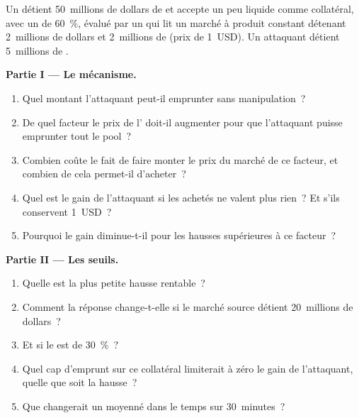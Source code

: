 \begin{problem}\label{pb:m3:defi-credit-and-leverage:1}
Un  détient 50~millions de dollars de  et accepte un  peu liquide comme collatéral, avec un  de 60~\%, évalué par un  qui lit un
marché à produit constant détenant 2~millions de dollars et 2~millions de  (prix de 1~USD). Un attaquant détient 5~millions de .

\medskip\noindent\textbf{Partie I --- Le mécanisme.}
\begin{enumerate}
\item Quel montant l'attaquant peut-il emprunter sans manipulation~?
\item De quel facteur le prix de l' doit-il augmenter pour que l'attaquant puisse emprunter tout le pool~?
\item Combien coûte le fait de faire monter le prix du marché de ce facteur, et combien de  cela permet-il d'acheter~?
\item Quel est le gain de l'attaquant si les  achetés ne valent plus rien~? Et s'ils conservent 1~USD~?
\item Pourquoi le gain diminue-t-il pour les hausses supérieures à ce facteur~?
\end{enumerate}

\medskip\noindent\textbf{Partie II --- Les seuils.}
\begin{enumerate}[resume]
\item Quelle est la plus petite hausse rentable~?
\item Comment la réponse change-t-elle si le marché source détient 20~millions de dollars~?
\item Et si le  est de 30~\%~?
\item Quel cap d'emprunt sur ce collatéral limiterait à zéro le gain de l'attaquant, quelle que soit la hausse~?
\item Que changerait un  moyenné dans le temps sur 30~minutes~?
\end{enumerate}


\end{problem}
